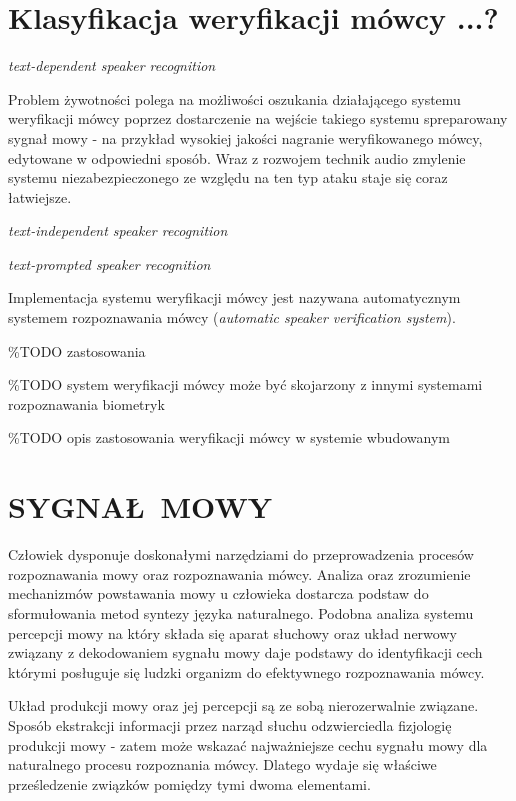 \section{Klasyfikacja weryfikacji mówcy ...?}
\textit{text-dependent speaker recognition} \cite{fosr}

Problem żywotności polega na możliwości oszukania działającego systemu weryfikacji mówcy poprzez dostarczenie na wejście takiego systemu spreparowany sygnał mowy - na przykład wysokiej jakości nagranie weryfikowanego mówcy, edytowane w odpowiedni sposób. Wraz z rozwojem technik audio zmylenie systemu niezabezpieczonego ze względu na ten typ ataku staje się coraz łatwiejsze.

\textit{text-independent speaker recognition} \cite{fosr}

\textit{text-prompted speaker recognition} \cite{fosr}

Implementacja systemu weryfikacji mówcy jest nazywana automatycznym systemem rozpoznawania mówcy (\textit{automatic speaker verification system}).

\%TODO zastosowania 

\%TODO system weryfikacji mówcy może być skojarzony z innymi systemami rozpoznawania biometryk

\%TODO opis zastosowania weryfikacji mówcy w systemie wbudowanym

\section{SYGNAŁ MOWY}


Człowiek dysponuje doskonałymi narzędziami do przeprowadzenia procesów rozpoznawania mowy oraz rozpoznawania mówcy. Analiza oraz zrozumienie mechanizmów powstawania mowy u człowieka dostarcza podstaw do sformułowania metod syntezy języka naturalnego. Podobna analiza systemu percepcji mowy na który składa się aparat słuchowy oraz układ nerwowy związany z dekodowaniem sygnału mowy daje podstawy do identyfikacji cech którymi posługuje się ludzki organizm do efektywnego rozpoznawania mówcy.

Układ produkcji mowy oraz jej percepcji są ze sobą nierozerwalnie związane. Sposób ekstrakcji informacji przez narząd słuchu odzwierciedla fizjologię produkcji mowy - zatem może wskazać najważniejsze cechu sygnału mowy dla naturalnego procesu rozpoznania mówcy. Dlatego wydaje się właściwe prześledzenie związków pomiędzy tymi dwoma elementami.

